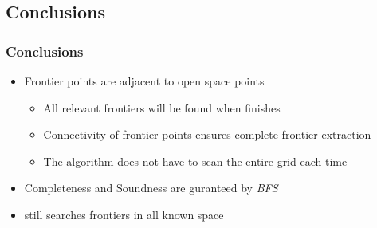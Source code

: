 \subsection*{Conclusions}
\begin{frame}
\frametitle{\WFD Conclusions}
\begin{itemize}
  \item Frontier points are adjacent to open space points
  	\begin{itemize}
  	  \item All relevant frontiers will be found when \WFD finishes
  	  \item Connectivity of frontier points ensures complete frontier extraction
  	  \item The algorithm does not have to scan the entire grid
  each time 
  	\end{itemize} 
  \item Completeness and Soundness are guranteed by \emph{BFS}
  \item \WFD still searches frontiers in all known space
\end{itemize}
\end{frame}